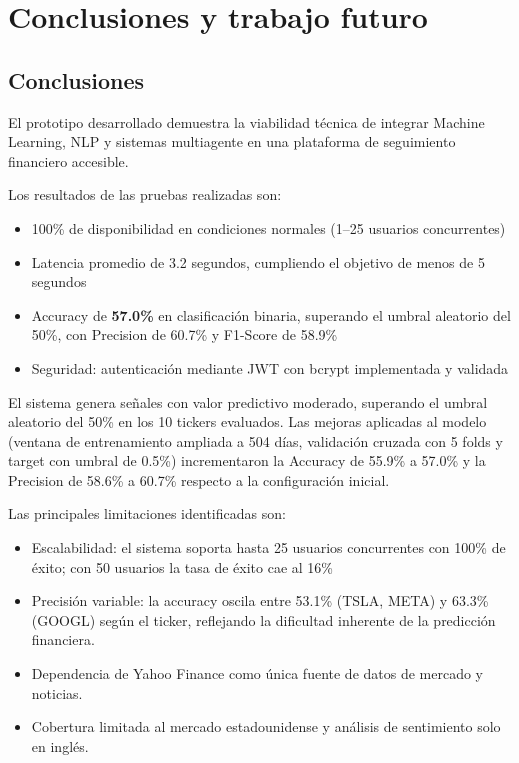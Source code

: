  \chapter{Conclusiones y trabajo futuro}


  \section{Conclusiones}

  El prototipo desarrollado demuestra la viabilidad técnica de integrar Machine Learning, NLP 
  y sistemas multiagente en una plataforma de seguimiento financiero accesible. 

Los resultados de las pruebas realizadas son:                                                                                         
  \begin{itemize}                                                                             
      \item 100\% de disponibilidad en condiciones normales (1--25 usuarios concurrentes)     
      \item Latencia promedio de 3.2 segundos, cumpliendo el objetivo de menos de 5 segundos  
      \item Accuracy de \textbf{57.0\%} en clasificación binaria, superando el umbral aleatorio del 50\%, con Precision de 60.7\% y F1-Score de 58.9\%
       \item Seguridad: autenticación mediante JWT con bcrypt implementada y validada
  \end{itemize}
  
 El sistema genera señales con valor predictivo moderado, superando el umbral aleatorio del 50\% en los 10 tickers evaluados. Las mejoras aplicadas al modelo (ventana de entrenamiento ampliada a 504 días, validación cruzada con 5 folds y target con umbral de 0.5\%) incrementaron la Accuracy de 55.9\% a 57.0\% y la Precision de 58.6\% a 60.7\% respecto a la configuración inicial.

  Las principales limitaciones identificadas son:

  \begin{itemize}
      \item Escalabilidad: el sistema soporta hasta 25 usuarios concurrentes con 100\% de     
  éxito; con 50 usuarios la tasa de éxito cae al 16\%
      \item Precisión variable: la accuracy oscila entre 53.1\% (TSLA, META) y 63.3\% (GOOGL) según el ticker, reflejando la dificultad inherente de la predicción financiera.
      \item Dependencia de Yahoo Finance como única fuente de datos de mercado y noticias.    
      \item Cobertura limitada al mercado estadounidense y análisis de sentimiento solo en   inglés.
  \end{itemize}

